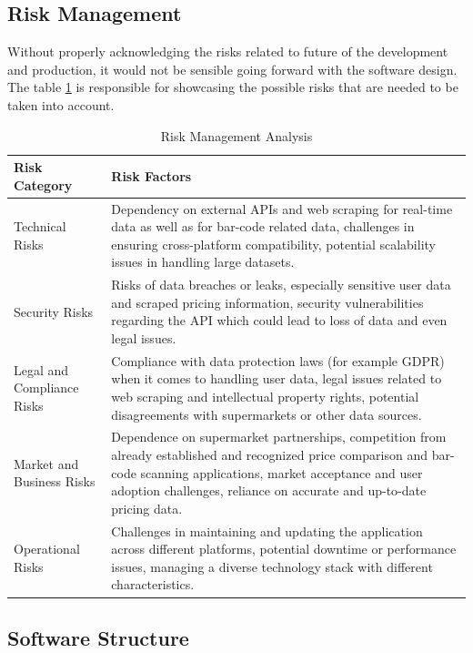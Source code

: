 \newpage

\subsection{Risk Management}

Without properly acknowledging the risks related to future of the development and production, it would not be sensible going forward with the software design. The table \ref{tab:risk} is responsible for showcasing the possible risks that are needed to be taken into account.

\begin{table}[ht]
	\centering
	\begin{tabularx}{\textwidth}{|l|X|}
		\hline
		\textbf{Risk Category} & \textbf{Risk Factors} \\ 
		\hline
		Technical Risks & Dependency on external APIs and web scraping for real-time data as well as for bar-code related data, challenges in ensuring cross-platform compatibility, potential scalability issues in handling large datasets. \\ 
		\hline
		Security Risks & Risks of data breaches or leaks, especially sensitive user data and scraped pricing information, security vulnerabilities regarding the API which could lead to loss of data and even legal issues. \\ 
		\hline
		Legal and Compliance Risks & Compliance with data protection laws (for example GDPR) when it comes to handling user data, legal issues related to web scraping and intellectual property rights, potential disagreements with supermarkets or other data sources. \\ 
		\hline
		Market and Business Risks & Dependence on supermarket partnerships, competition from already established and recognized price comparison and bar-code scanning applications, market acceptance and user adoption challenges, reliance on accurate and up-to-date pricing data. \\ 
		\hline
		Operational Risks & Challenges in maintaining and updating the application across different platforms, potential downtime or performance issues, managing a diverse technology stack with different characteristics. \\
		\hline
	\end{tabularx}
	\caption{Risk Management Analysis}
	\label{tab:risk}
\end{table}
\space

\subsection{Software Structure}

